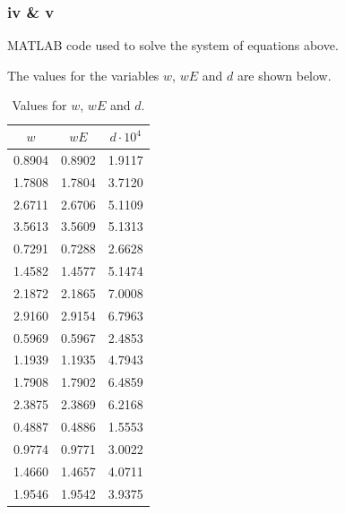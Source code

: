 \documentclass[11pt]{article}
\numberwithin{equation}{section}
\begin{document}
\subsubsection*{iv \& v}
MATLAB code used to solve the system of equations above.

The values for the variables $w$, $wE$ and $d$ are shown below.
\begin{table}[H]
\centering
\label{q2bvals}
	\begin{tabular}{||c|c|c||} 
	\hline
	$w$ & $wE$ & $d\cdot 10^{4}$\\
	\hline
	\hline
	0.8904 & 0.8902 & 1.9117\\
	1.7808 & 1.7804 & 3.7120\\
	2.6711 & 2.6706 & 5.1109\\
	3.5613 & 3.5609 & 5.1313\\
	0.7291 & 0.7288 & 2.6628\\
	1.4582 & 1.4577 & 5.1474\\
	2.1872 & 2.1865 & 7.0008\\
	2.9160 & 2.9154 & 6.7963\\
	0.5969 & 0.5967 & 2.4853\\
	1.1939 & 1.1935 & 4.7943\\
	1.7908 & 1.7902 & 6.4859\\
	2.3875 & 2.3869 & 6.2168\\
	0.4887 & 0.4886 & 1.5553\\
	0.9774 & 0.9771 & 3.0022\\
	1.4660 & 1.4657 & 4.0711\\
	1.9546 & 1.9542 & 3.9375\\
	\hline
 \end{tabular}
 \caption{Values for $w$, $wE$ and $d$.}
\end{table}
\end{document}

